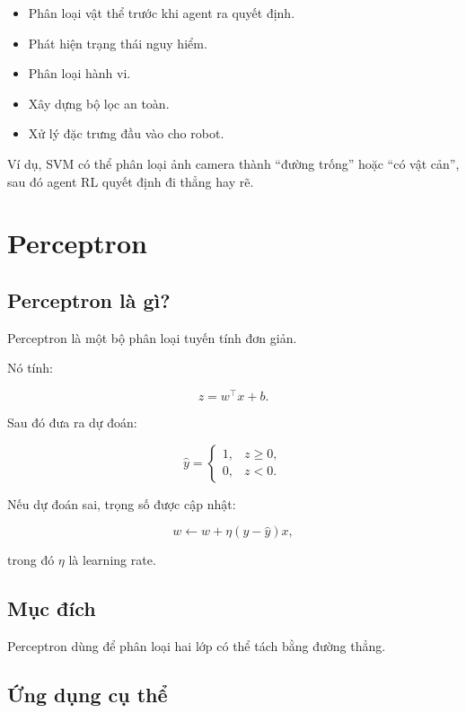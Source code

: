 \documentclass[12pt,a4paper]{report}
\begin{document}
\begin{itemize}[leftmargin=1.5em]
    \item Phân loại vật thể trước khi agent ra quyết định.
    \item Phát hiện trạng thái nguy hiểm.
    \item Phân loại hành vi.
    \item Xây dựng bộ lọc an toàn.
    \item Xử lý đặc trưng đầu vào cho robot.
\end{itemize}

Ví dụ, SVM có thể phân loại ảnh camera thành ``đường trống'' hoặc ``có vật cản'', sau đó agent RL quyết định đi thẳng hay rẽ.

\section{Perceptron}

\subsection{Perceptron là gì?}

Perceptron là một bộ phân loại tuyến tính đơn giản.

Nó tính:

\begin{equation}
z=w^\top x+b.
\end{equation}

Sau đó đưa ra dự đoán:

\begin{equation}
\hat{y}
=
\begin{cases}
1, & z \geq 0,\\
0, & z < 0.
\end{cases}
\end{equation}

Nếu dự đoán sai, trọng số được cập nhật:

\begin{equation}
w
\leftarrow
w+\eta(y-\hat{y})x,
\end{equation}

trong đó \(\eta\) là learning rate.

\subsection{Mục đích}

Perceptron dùng để phân loại hai lớp có thể tách bằng đường thẳng.

\subsection{Ứng dụng cụ thể}
\end{document}
